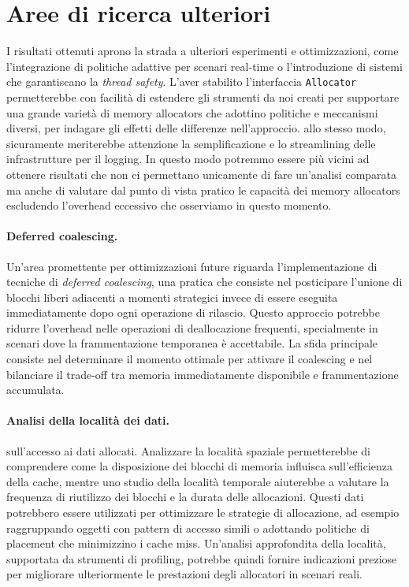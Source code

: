 \section{Aree di ricerca ulteriori}

I risultati ottenuti aprono la strada a ulteriori esperimenti e ottimizzazioni, come l’integrazione di politiche adattive per scenari real-time o l'introduzione di sistemi che garantiscano la \textit{thread safety}. L'aver stabilito l'interfaccia \texttt{Allocator} permetterebbe con facilità di estendere gli strumenti da noi creati per supportare una grande varietà di memory allocators che adottino politiche e meccanismi diversi, per indagare gli effetti delle differenze nell'approccio. allo stesso modo, sicuramente meriterebbe attenzione la semplificazione e lo streamlining delle infrastrutture per il logging. In questo modo potremmo essere più vicini ad ottenere risultati che non ci permettano unicamente di fare un'analisi comparata ma anche di valutare dal punto di vista pratico le capacità dei memory allocators escludendo l'overhead eccessivo che osserviamo in questo momento.

\paragraph{Deferred coalescing.}
Un'area promettente per ottimizzazioni future riguarda l'implementazione di tecniche di \textit{deferred coalescing}, una pratica che consiste nel posticipare l'unione di blocchi liberi adiacenti a momenti strategici invece di essere eseguita immediatamente dopo ogni operazione di rilascio. Questo approccio potrebbe ridurre l'overhead nelle operazioni di deallocazione frequenti, specialmente in scenari dove la frammentazione temporanea è accettabile. La sfida principale consiste nel determinare il momento ottimale per attivare il coalescing e nel bilanciare il trade-off tra memoria immediatamente disponibile e frammentazione accumulata.

\paragraph{Analisi della località dei dati.}
sull'accesso ai dati allocati. Analizzare la località spaziale permetterebbe di comprendere come la disposizione dei blocchi di memoria influisca sull'efficienza della cache, mentre uno studio della località temporale aiuterebbe a valutare la frequenza di riutilizzo dei blocchi e la durata delle allocazioni. Questi dati potrebbero essere utilizzati per ottimizzare le strategie di allocazione, ad esempio raggruppando oggetti con pattern di accesso simili o adottando politiche di placement che minimizzino i cache miss. Un'analisi approfondita della località, supportata da strumenti di profiling, potrebbe quindi fornire indicazioni preziose per migliorare ulteriormente le prestazioni degli allocatori in scenari reali.

